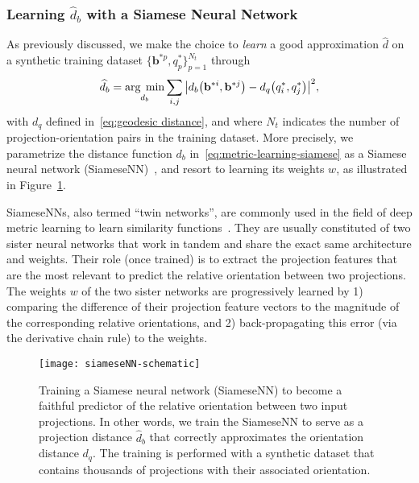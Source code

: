 \subsubsection{Learning $\widehat{d}_b$ with a Siamese Neural Network}

As previously discussed, we make the choice to \textit{learn} a good approximation $\widehat{d}$ on a synthetic training dataset $\big\{ \mathbf{b}^{*p}, q^*_p\big\}_{p=1}^{N_t}$ through
\begin{equation}
    \label{eq:metric-learning-siamese}
    \widehat{d}_b=\underset{d_b}{\arg\;\min}\sum_{i,j} \big|d_b\big(\mathbf{b}^{*i},\mathbf{b}^{*j}\big) - d_q\big(q^*_i,q^*_j\big) \big|^2,
\end{equation}
with $d_q$ defined in~\eqref{eq:geodesic distance}, and where $N_t$ indicates the number of projection-orientation pairs in the training dataset. More precisely, we parametrize the distance function $d_b$ in~\eqref{eq:metric-learning-siamese} as a Siamese neural network (SiameseNN)~\cite{chopra2005learning}, and resort to learning its weights $w$, as illustrated in Figure~\ref{fig:siamese-schematic}.

SiameseNNs, also termed ``twin networks'', are commonly used in the field of deep metric learning to learn similarity functions~\cite{yi2014deep}. They are usually constituted of two sister neural networks that work in tandem and share the exact same architecture and weights.  Their role (once trained) is to extract the projection features that are the most relevant to predict the relative orientation between two projections. The weights $w$ of the two sister networks are progressively learned by 1) comparing the difference of their projection feature vectors to the magnitude of the corresponding relative orientations, and 2) back-propagating this error (via the derivative chain rule) to the weights.

\begin{figure}
    \centering
    \texttt{[image: siameseNN-schematic]}
    \caption{Training a Siamese neural network (SiameseNN) to become a faithful predictor of the relative orientation between two input projections. In other words, we train the SiameseNN to serve as a projection distance $\widehat{d}_b$ that correctly approximates the orientation distance $d_q$. The training is performed with a synthetic dataset that contains thousands of projections with their associated orientation.}
    \label{fig:siamese-schematic}
\end{figure}

